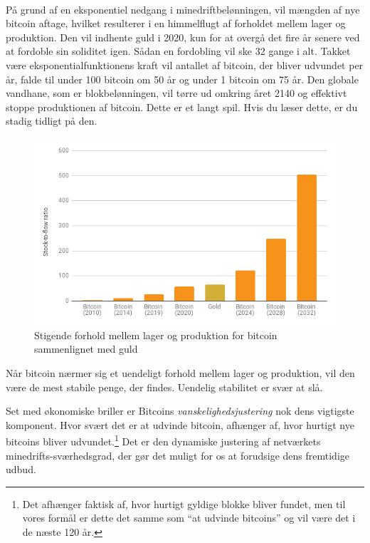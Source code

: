 \documentclass[paper=6in:9in,pagesize=pdftex,
               headinclude=on,footinclude=on,12pt]{scrbook}
\begin{document}
\paragraph{} På grund af en eksponentiel nedgang i minedriftbelønningen, vil mængden af nye bitcoin aftage, hvilket resulterer i en himmelflugt af forholdet mellem lager og produktion. Den vil indhente guld i 2020, kun for at overgå det fire år senere ved at fordoble sin soliditet igen. Sådan en fordobling vil ske 32 gange i alt. Takket være eksponentialfunktionens kraft vil antallet af bitcoin, der bliver udvundet per år, falde til under 100 bitcoin om 50 år og under 1 bitcoin om 75 år. Den globale vandhane, som er blokbelønningen, vil tørre ud omkring året 2140 og effektivt stoppe produktionen af bitcoin. Dette er et langt spil. Hvis du læser dette, er du stadig tidligt på den.\begin{figure}
  \includegraphics{assets/images/soundness-over-time.png}
  \caption{Stigende forhold mellem lager og produktion for bitcoin sammenlignet med guld}
  \label{fig:soundness-over-time}
\end{figure}

Når bitcoin nærmer sig et uendeligt forhold mellem lager og produktion, vil den være de mest stabile penge, der findes. Uendelig stabilitet er svær at slå.

Set med økonomiske briller er Bitcoins \textit{vanskelighedsjustering} nok dens vigtigste komponent. Hvor svært det er at udvinde bitcoin, afhænger af, hvor hurtigt nye bitcoins bliver udvundet.\footnote{Det afhænger faktisk af, hvor hurtigt gyldige blokke bliver fundet, men til vores formål er dette det samme som \enquote{at udvinde bitcoins} og vil være det i de næste 120 år.} Det er den dynamiske justering af netværkets minedrifts-sværhedsgrad, der gør det muligt for os at forudsige dens fremtidige udbud.
\end{document}
